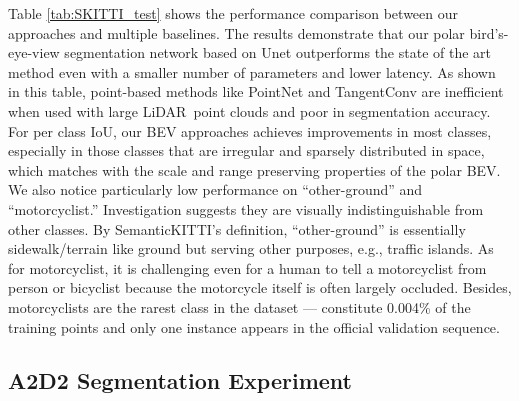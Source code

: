 \documentclass[10pt,twocolumn,letterpaper]{article}
\newcommand{\lidar}{\mbox{LiDAR }}
\begin{document}
 Table \ref{tab:SKITTI_test} shows the performance comparison between our approaches and multiple baselines. The results demonstrate that our polar bird's-eye-view segmentation network based on Unet outperforms the state of the art method even with a smaller number of parameters and lower latency. As shown in this table, point-based methods like PointNet and TangentConv are inefficient when used with large \lidar point clouds and poor in segmentation accuracy. For per class IoU, our BEV approaches achieves improvements in most classes, especially in those classes that are irregular and sparsely distributed in space, which matches with the scale and range preserving properties of the polar BEV. We also notice particularly low performance on ``other-ground'' and ``motorcyclist.'' Investigation suggests they are visually indistinguishable from other classes. By SemanticKITTI's definition, ``other-ground'' is essentially sidewalk/terrain like ground but serving other purposes, e.g.,  traffic islands. As for motorcyclist, it is challenging even for a human to tell a motorcyclist from person or bicyclist because the motorcycle itself is often largely occluded. Besides, motorcyclists are the rarest class in the dataset --- constitute 0.004\% of the training points and only one instance appears in the official validation sequence.

\subsection{A2D2 Segmentation Experiment}



\iffalse
\begin{figure}[htbp]
\centering
\subfigure[SemanticKITTI]{
\texttt{[image: fig/skitti\_vis\_2.png]}
\label{fig.skitti_vis}
}
\quad
\subfigure[A2D2]{
\texttt{[image: fig/a2d2\_vis\_2.png]}
}
\quad
\caption{Point cloud visualization of SemanticKITTI and A2D2 datasets. One can clearly see how A2D2's 
non-vertical \lidar scanlines are entangled.}
\label{fig.a2d2_vis}
\end{figure}
\fi
\end{document}
